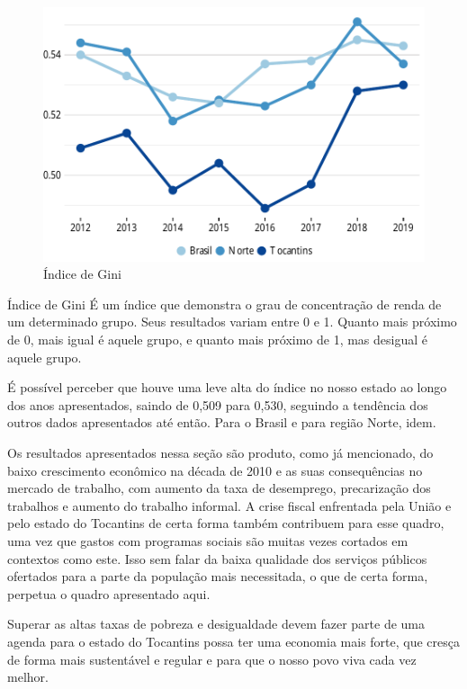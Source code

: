 \begin{figure}[h]
	\caption{Índice de Gini}
	\includegraphics{fig/gini.pdf}
\end{figure}
\begin{smbox}[label={labelbox},nameref={Índice de Gini}]{Índice de Gini}
	É um índice que demonstra o grau de concentração de renda de um determinado grupo. Seus resultados variam entre 0 e 1. Quanto mais próximo de 0, mais igual é aquele grupo, e quanto mais próximo de 1, mas desigual é aquele grupo.
\end{smbox}
\par É possível perceber que houve uma leve alta do índice no nosso estado ao longo dos anos apresentados, saindo de 0,509 para 0,530, seguindo a tendência dos outros dados apresentados até então. Para o Brasil e para região Norte, idem. 
\par Os resultados apresentados nessa seção são produto, como já mencionado, do baixo crescimento econômico na década de 2010 e as suas consequências no mercado de trabalho, com aumento da taxa de desemprego, precarização dos trabalhos e aumento do trabalho informal. A crise fiscal enfrentada pela União e pelo estado do Tocantins de certa forma também contribuem para esse quadro, uma vez que gastos com programas sociais são muitas vezes cortados em contextos como este. Isso sem falar da baixa qualidade dos serviços públicos ofertados para a parte da população mais necessitada, o que de certa forma, perpetua o quadro apresentado aqui.
\par Superar as altas taxas de pobreza e desigualdade devem fazer parte de uma agenda para o estado do Tocantins possa ter uma economia mais forte, que cresça de forma mais sustentável e regular e para que o nosso povo viva cada vez melhor.  